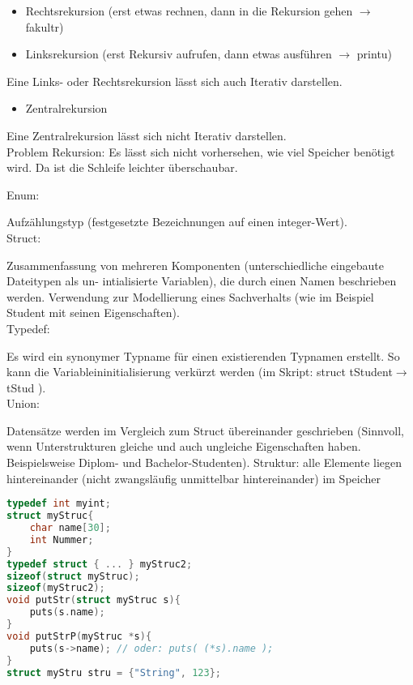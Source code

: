 \begin{multicols}{3}

\begin{itemize}
\item Rechtsrekursion (erst etwas rechnen, dann in die Rekursion gehen $\rightarrow$ fakultr)
\item Linksrekursion (erst Rekursiv aufrufen, dann etwas ausführen $\rightarrow$ printu)
\end{itemize}
Eine Links- oder Rechtsrekursion lässt sich auch Iterativ darstellen.
\begin{itemize}
\item Zentralrekursion
\end{itemize}
Eine Zentralrekursion lässt sich nicht Iterativ darstellen.\smallskip\\
Problem Rekursion: Es lässt sich nicht vorhersehen, wie viel Speicher benötigt wird. Da ist die Schleife leichter überschaubar.


Enum:

Aufzählungstyp (festgesetzte Bezeichnungen auf einen integer-Wert).\smallskip\\
Struct:

Zusammenfassung von mehreren Komponenten (unterschiedliche eingebaute Dateitypen als un- intialisierte Variablen), die durch einen Namen beschrieben werden. Verwendung zur Modellierung eines Sachverhalts (wie im Beispiel Student mit seinen Eigenschaften).\smallskip\\
Typedef:

Es wird ein synonymer Typname für einen existierenden Typnamen erstellt. So kann die Variableininitialisierung verkürzt werden (im Skript: struct tStudent$\rightarrow$tStud ).\smallskip\\
Union:

Datensätze werden im Vergleich zum Struct übereinander geschrieben (Sinnvoll, wenn Unterstrukturen gleiche und auch ungleiche Eigenschaften haben. Beispielsweise Diplom- und Bachelor-Studenten).
\HRule[4pt]
Struktur: alle Elemente liegen hintereinander (nicht zwangsläufig unmittelbar hintereinander) im Speicher
\begin{lstlisting}[language=C]
typedef int myint; 
struct myStruc{
	char name[30];
	int Nummer;
} 
typedef struct { ... } myStruc2;
sizeof(struct myStruc);
sizeof(myStruc2);
void putStr(struct myStruc s){
	puts(s.name);
}
void putStrP(myStruc *s){
	puts(s->name); // oder: puts( (*s).name );
}
struct myStru stru = {"String", 123};
\end{lstlisting}


\end{multicols}
